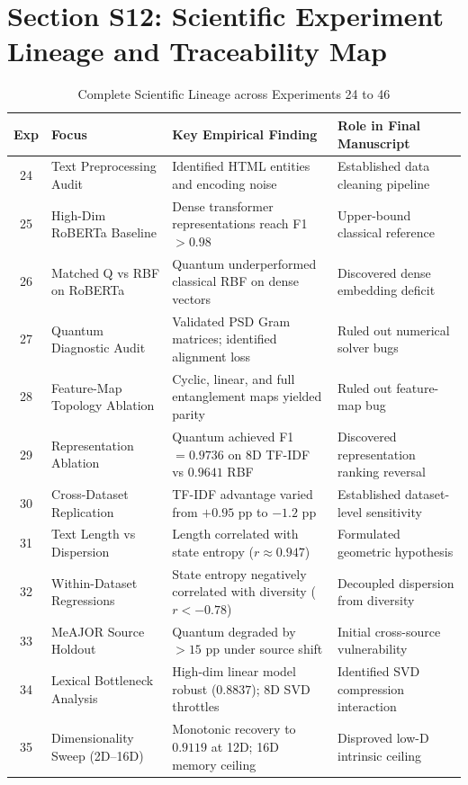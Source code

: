 \documentclass[10pt,letterpaper]{article}
\begin{document}
\section{Section S12: Scientific Experiment Lineage and Traceability Map}
\label{sec:supp_lineage}

\begin{table}[h!]
\centering
\small
\caption{Complete Scientific Lineage across Experiments 24 to 46}
\label{tab:supp_lineage_table}
\begin{tabular}{clll}
\toprule
\textbf{Exp} & \textbf{Focus} & \textbf{Key Empirical Finding} & \textbf{Role in Final Manuscript} \\
\midrule
24 & Text Preprocessing Audit & Identified HTML entities and encoding noise & Established data cleaning pipeline \\
25 & High-Dim RoBERTa Baseline & Dense transformer representations reach F1 $>0.98$ & Upper-bound classical reference \\
26 & Matched Q vs RBF on RoBERTa & Quantum underperformed classical RBF on dense vectors & Discovered dense embedding deficit \\
27 & Quantum Diagnostic Audit & Validated PSD Gram matrices; identified alignment loss & Ruled out numerical solver bugs \\
28 & Feature-Map Topology Ablation & Cyclic, linear, and full entanglement maps yielded parity & Ruled out feature-map bug \\
29 & Representation Ablation & Quantum achieved F1 $=0.9736$ on 8D TF-IDF vs $0.9641$ RBF & Discovered representation ranking reversal \\
30 & Cross-Dataset Replication & TF-IDF advantage varied from $+0.95$ pp to $-1.2$ pp & Established dataset-level sensitivity \\
31 & Text Length vs Dispersion & Length correlated with state entropy ($r \approx 0.947$) & Formulated geometric hypothesis \\
32 & Within-Dataset Regressions & State entropy negatively correlated with diversity ($r < -0.78$) & Decoupled dispersion from diversity \\
33 & MeAJOR Source Holdout & Quantum degraded by $>15$ pp under source shift & Initial cross-source vulnerability \\
34 & Lexical Bottleneck Analysis & High-dim linear model robust ($0.8837$); 8D SVD throttles & Identified SVD compression interaction \\
35 & Dimensionality Sweep (2D–16D) & Monotonic recovery to $0.9119$ at 12D; 16D memory ceiling & Disproved low-D intrinsic ceiling \\

\end{tabular}
\end{table}
\end{document}

